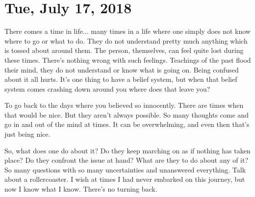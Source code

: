 \section{Tue, July 17, 2018}

There comes a time in life... many times in a life where one simply does not
know where to go or what to do. They do not understand pretty much anything
which is tossed about around them. The person, themselves, can feel quite lost
during these times. There's nothing wrong with such feelings. Teachings of the
past flood their mind, they do not understand or know what is going on. Being
confused about it all hurts. It's one thing to have a belief system, but when
that belief system comes crashing down around you where does that leave you?

To go back to the days where you believed so innocently. There are times when
that would be nice. But they aren't always possible. So many thoughts come and
go in and out of the mind at times. It can be overwhelming, and even then that's
just being nice.

So, what does one do about it? Do they keep marching on as if nothing has taken
place? Do they confront the issue at hand? What are they to do about any of it?
So many questions with so many uncertainties and unanswered everything. Talk
about a rollercoaster. I wish at times I had never embarked on this journey, but
now I know what I know. There's no turning back.